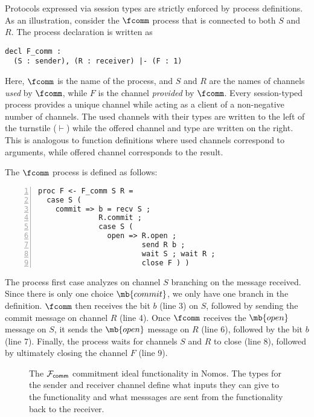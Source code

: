 Protocols expressed via session types are strictly enforced by
process definitions.
As an illustration, consider the $\fcomm$ process that is connected
to both $S$ and $R$.
The process declaration is written as
\begin{lstlisting}[basicstyle=\small\ttfamily]
decl F_comm :
  (S : sender), (R : receiver) |- (F : 1)
\end{lstlisting}
Here, $\fcomm$ is the name of the process, and $S$ and $R$ are the names
of channels \emph{used} by $\fcomm$, while $F$ is the channel \emph{provided}
by $\fcomm$.
Every session-typed process provides a unique channel while acting as a client
of a non-negative number of channels.
The used channels with their types are written to the left of the turnstile
($\vdash$) while the offered channel and type are written on the right.
This is analogous to function definitions where used channels correspond to
arguments, while offered channel corresponds to the result.

The $\fcomm$ process is defined as follows:
\begin{lstlisting}[basicstyle=\small\ttfamily, numbers=left,xleftmargin=2em]
proc F <- F_comm S R =
  case S (
    commit => b = recv S ;
              R.commit ;
              case S (
                open => R.open ;
                        send R b ;
                        wait S ; wait R ;
                        close F ) )
\end{lstlisting}
The process first case analyzes on channel $S$ branching on the
message received.
Since there is only one choice $\mb{commit}$, we only have one
branch in the definition.
$\fcomm$ then receives the bit $b$ (line 3) on $S$, followed by sending the
commit message on channel $R$ (line 4).
Once $\fcomm$ receives the $\mb{open}$ message on $S$, it sends the
$\mb{open}$ message on $R$ (line 6), followed by the bit $b$ (line 7).
Finally, the process waits for channels $S$ and $R$ to close (line 8),
followed by ultimately closing the channel $F$ (line 9).


\begin{figure*}[!ht]
  
  \caption{The $\mathcal{F}_{{\mathsf {comm}}}$
  commitment ideal functionality in Nomos.
  The types for the sender and receiver channel define what inputs they
  can give to the functionality and what messsages are sent from the
  functionality back to the receiver.}
  \label{fig:nomos:commitment}
  \end{figure*}

